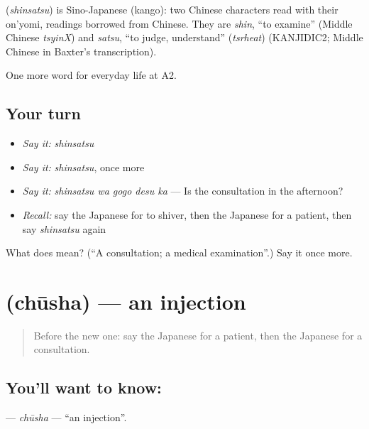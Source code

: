 \begin{cousinweb}
\textbf{} (\emph{shinsatsu}) is Sino-Japanese (kango): two Chinese characters read with their on'yomi, readings borrowed from Chinese. They are \emph{shin}, \textquotedblleft{}to examine\textquotedblright{} (Middle Chinese \emph{tsyinX}) and \emph{satsu}, \textquotedblleft{}to judge, understand\textquotedblright{} (\emph{tsrheat}) (KANJIDIC2; Middle Chinese in Baxter's transcription).
\end{cousinweb}

\begin{grammarlens}[title={What you've built}]
One more word for everyday life at A2.
\end{grammarlens}

\subsection*{Your turn}
\begin{itemize}
\raggedright
  \item \emph{Say it:} \emph{shinsatsu}
  \item \emph{Say it:} \emph{shinsatsu}, once more
  \item \emph{Say it:} \emph{shinsatsu wa gogo desu ka} — Is the consultation in the afternoon?
  \item \emph{Recall:} say the Japanese for to shiver, then the Japanese for a patient, then say \emph{shinsatsu} again
\end{itemize}

\begin{tcolorbox}[breakable,colback=teal!4,colframe=teal!35!black,title={Before you move on}]
What does  mean? (\textquotedblleft{}A consultation; a medical examination\textquotedblright{}.) Say it once more.
\end{tcolorbox}
\section[\texorpdfstring{\ja{ちゅうしゃ} (chūsha)}{ちゅうしゃ (chūsha)}]{ (chūsha) — an injection}

\label{lesson:JA-C217-chuusha}



\begin{quote}
Before the new one: say the Japanese for a patient, then the Japanese for a consultation.
\end{quote}

\subsection*{You'll want to know: }
\textbf{} — \emph{chūsha} — \textquotedblleft{}an injection\textquotedblright{}.

